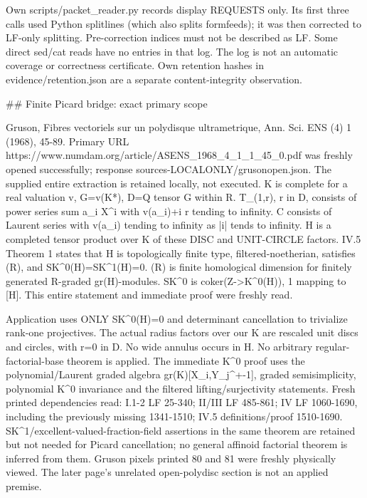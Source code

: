 \documentclass[11pt]{article}
\begin{document}
Own scripts/packet\_reader.py records display REQUESTS only. Its first three calls used Python splitlines (which also splits formfeeds); it was then corrected to LF-only splitting. Pre-correction indices must not be described as LF. Some direct sed/cat reads have no entries in that log. The log is not an automatic coverage or correctness certificate. Own retention hashes in evidence/retention.json are a separate content-integrity observation.

\#\# Finite Picard bridge: exact primary scope

Gruson, Fibres vectoriels sur un polydisque ultrametrique, Ann. Sci. ENS (4) 1 (1968), 45-89. Primary URL https://www.numdam.org/article/ASENS\_1968\_4\_1\_1\_45\_0.pdf was freshly opened successfully; response sources-LOCALONLY/grusonopen.json. The supplied entire extraction is retained locally, not executed. K is complete for a real valuation v, G=v(K*), D=Q tensor G within R. T\_(1,r), r in D, consists of power series sum a\_i X\textasciicircum{}i with v(a\_i)+i r tending to infinity. C consists of Laurent series with v(a\_i) tending to infinity as |i| tends to infinity. H is a completed tensor product over K of these DISC and UNIT-CIRCLE factors. IV.5 Theorem 1 states that H is topologically finite type, filtered-noetherian, satisfies (R), and SK\textasciicircum{}0(H)=SK\textasciicircum{}1(H)=0. (R) is finite homological dimension for finitely generated R-graded gr(H)-modules. SK\textasciicircum{}0 is coker(Z->K\textasciicircum{}0(H)), 1 mapping to [H]. This entire statement and immediate proof were freshly read.

Application uses ONLY SK\textasciicircum{}0(H)=0 and determinant cancellation to trivialize rank-one projectives. The actual radius factors over our K are rescaled unit discs and circles, with r=0 in D. No wide annulus occurs in H. No arbitrary regular-factorial-base theorem is applied. The immediate K\textasciicircum{}0 proof uses the polynomial/Laurent graded algebra gr(K)[X\_i,Y\_j\textasciicircum{}+-1], graded semisimplicity, polynomial K\textasciicircum{}0 invariance and the filtered lifting/surjectivity statements. Fresh printed dependencies read: I.1-2 LF 25-340; II/III LF 485-861; IV LF 1060-1690, including the previously missing 1341-1510; IV.5 definitions/proof 1510-1690. SK\textasciicircum{}1/excellent-valued-fraction-field assertions in the same theorem are retained but not needed for Picard cancellation; no general affinoid factorial theorem is inferred from them. Gruson pixels printed 80 and 81 were freshly physically viewed. The later page's unrelated open-polydisc section is not an applied premise.
\end{document}
